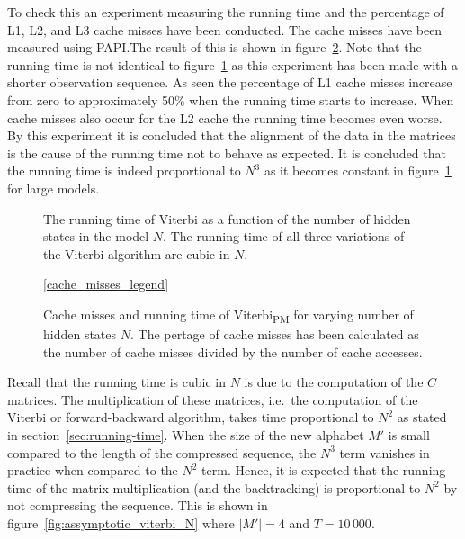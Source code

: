 To check this an experiment measuring the running time and the percentage of
L1, L2, and L3 cache misses have been conducted. The cache misses have been
measured using PAPI.\@ The result of this is shown in
figure~\ref{fig:cache-misses}. Note that the running time is not identical to
figure~\ref{fig:assymptotic_viterbi_backtrack_N} as this experiment has been
made with a shorter observation sequence. As seen the percentage of L1 cache
misses increase from zero to approximately 50\% when the running time starts to
increase. When cache misses also occur for the L2 cache the running time
becomes even worse. By this experiment it is concluded that the alignment of
the data in the matrices is the cause of the running time not to behave as
expected. It is concluded that the running time is indeed proportional to $N^3$
as it becomes constant in figure~\ref{fig:assymptotic_viterbi_backtrack_N} for
large models.

\begin{figure}
  \centering
  
  \caption{The running time of Viterbi as a function of the number of hidden
    states in the model $N$. The running time of all three variations of the Viterbi
    algorithm are cubic in $N$.}
  \label{fig:assymptotic_viterbi_backtrack_N}
\end{figure}

\begin{figure}
  \centering\ref{cache_misses_legend}\\
  
  \caption{Cache misses and running time of Viterbi\textsubscript{PM} for
    varying number of hidden states $N$. The pertage of cache misses has been
    calculated as the number of cache misses divided by the number of cache
    accesses.}
  \label{fig:cache-misses}
\end{figure}

Recall that the running time is cubic in $N$ is due to the computation of the
$C$ matrices. The multiplication of these matrices, i.e.\ the computation
of the Viterbi or forward-backward algorithm, takes time
proportional to $N^2$ as stated in section~\ref{sec:running-time}. When the
size of the new alphabet $M'$ is small compared to the length of the compressed
sequence, the $N^3$ term vanishes in practice when compared to the $N^2$
term. Hence, it is expected that the running time of the matrix multiplication
(and the backtracking) is proportional to $N^2$ by not compressing the
sequence. This is shown in figure~\ref{fig:assymptotic_viterbi_N} where
$\lvert M' \rvert = 4$ and $T = 10\,000$.

